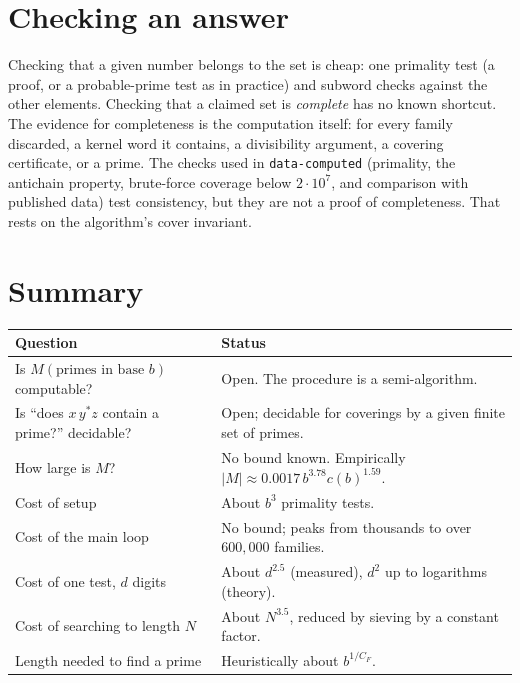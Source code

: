 \documentclass[11pt]{article}
\theoremstyle{remark}
\newcommand{\code}[1]{\texttt{#1}}
\begin{document}
\section{Checking an answer}

Checking that a given number belongs to the set is cheap: one primality test (a proof, or a probable-prime test as in practice) and subword checks against the other elements. Checking that a claimed set is \emph{complete} has no known shortcut. The evidence for completeness is the computation itself: for every family discarded, a kernel word it contains, a divisibility argument, a covering certificate, or a prime. The checks used in \code{data-computed} (primality, the antichain property, brute-force coverage below $2\cdot10^7$, and comparison with published data) test consistency, but they are not a proof of completeness. That rests on the algorithm's cover invariant.

\section{Summary}

\begin{center}
\small
\begin{tabular}{@{}lp{8cm}@{}}
\toprule
Question & Status\\
\midrule
Is $M(\text{primes in base }b)$ computable? & Open. The procedure is a semi-algorithm.\\
Is ``does $x\,y^*z$ contain a prime?'' decidable? & Open; decidable for coverings by a given finite set of primes.\\
How large is $M$? & No bound known. Empirically $|M|\approx 0.0017\,b^{3.78}c(b)^{1.59}$.\\
Cost of setup & About $b^3$ primality tests.\\
Cost of the main loop & No bound; peaks from thousands to over $600{,}000$ families.\\
Cost of one test, $d$ digits & About $d^{2.5}$ (measured), $d^2$ up to logarithms (theory).\\
Cost of searching to length $N$ & About $N^{3.5}$, reduced by sieving by a constant factor.\\
Length needed to find a prime & Heuristically about $b^{1/C_F}$.\\
\bottomrule
\end{tabular}
\end{center}
\end{document}
